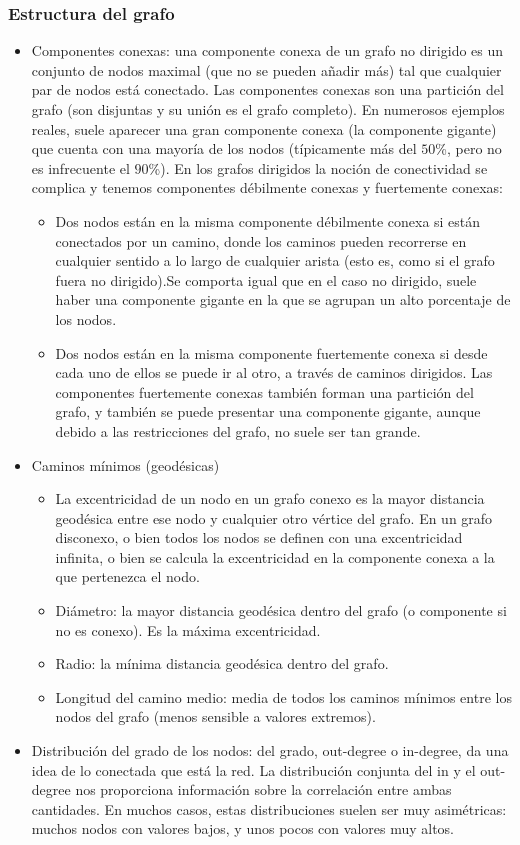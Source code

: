 \subsubsection{Estructura del grafo}
\begin{itemize}
\item Componentes conexas: una componente conexa de un grafo no dirigido es
un conjunto de nodos maximal (que no se pueden añadir más) tal que cualquier par de nodos
está conectado. Las componentes conexas son una partición del grafo (son disjuntas y
su unión es el grafo completo). En numerosos ejemplos reales, suele aparecer una gran
componente conexa (la componente gigante) que cuenta con una mayoría de los nodos (típicamente
más del $50$\%, pero no es infrecuente el $90$\%).  En los grafos dirigidos la noción de 
conectividad se complica y tenemos componentes débilmente conexas y fuertemente conexas:
	\begin{itemize}
	\item Dos nodos están en la misma componente débilmente conexa si están conectados por un camino,
	donde los caminos pueden recorrerse en cualquier sentido a lo largo de cualquier arista (esto es,
	como si el grafo fuera no dirigido).Se comporta igual que en el caso no dirigido, suele haber una
	componente gigante en la que se agrupan un alto porcentaje de los nodos.
	\item Dos nodos están en la misma componente fuertemente conexa si desde cada uno de ellos se puede
	ir al otro, a través de caminos dirigidos. Las componentes fuertemente conexas también
	forman una partición del grafo, y también se puede presentar una componente gigante,
	aunque debido a las restricciones del grafo, no suele ser tan grande. 
	\end{itemize}

\item Caminos mínimos (geodésicas)
	\begin{itemize}
	\item La excentricidad de un nodo en un grafo conexo es la mayor distancia
	geodésica entre ese nodo y cualquier otro vértice del grafo. En un grafo disconexo,
	o bien todos los nodos se definen con una excentricidad infinita, o bien se calcula 
	la excentricidad en la componente conexa a la que pertenezca el nodo. 
	\item Diámetro: la mayor distancia geodésica dentro del grafo (o componente si no es conexo). 
	Es la máxima excentricidad.
	\item Radio: la mínima distancia geodésica dentro del grafo.
	\item Longitud del camino medio: media de todos los caminos mínimos entre los 
	nodos del grafo (menos sensible a valores extremos).
	\end{itemize}
\item Distribución del grado de los nodos: del grado, out-degree o in-degree, da una idea
de lo conectada que está la red. La distribución conjunta del in y el out-degree
nos proporciona información sobre la correlación entre ambas cantidades. En muchos casos,
estas distribuciones suelen ser muy asimétricas: muchos nodos con valores bajos, y unos pocos
con valores muy altos.


\end{itemize}
